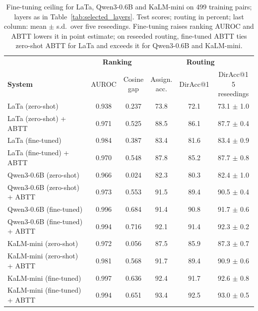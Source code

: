 \begin{table}[t]
\centering
\small
\setlength{\tabcolsep}{4pt}
\begin{tabular}{lccccc}
\toprule
& \multicolumn{2}{c}{\textbf{Ranking}} & \multicolumn{3}{c}{\textbf{Routing}} \\
\cmidrule(lr){2-3}\cmidrule(lr){4-6}
\textbf{System} & AUROC & \makecell{Cosine\\gap} & \makecell{Assign.\\acc.} & DirAcc@1 & \makecell{DirAcc@1\\5 reseedings} \\
\midrule
LaTa (zero-shot) & 0.938 & 0.237 & 73.8 & 72.1 & 73.1 $\pm$ 1.0 \\
LaTa (zero-shot) + ABTT & 0.971 & 0.525 & 88.5 & 86.1 & 87.7 $\pm$ 0.4 \\
LaTa (fine-tuned) & 0.984 & 0.387 & 83.4 & 81.6 & 83.4 $\pm$ 0.9 \\
LaTa (fine-tuned) + ABTT & 0.970 & 0.548 & 87.8 & 85.2 & 87.7 $\pm$ 0.8 \\
\midrule
Qwen3-0.6B (zero-shot) & 0.966 & 0.024 & 82.3 & 80.3 & 82.4 $\pm$ 1.0 \\
Qwen3-0.6B (zero-shot) + ABTT & 0.973 & 0.553 & 91.5 & 89.4 & 90.5 $\pm$ 0.4 \\
Qwen3-0.6B (fine-tuned) & 0.996 & 0.684 & 91.4 & 90.8 & 91.7 $\pm$ 0.6 \\
Qwen3-0.6B (fine-tuned) + ABTT & 0.994 & 0.716 & 92.1 & 91.4 & 92.3 $\pm$ 0.2 \\
\midrule
KaLM-mini (zero-shot) & 0.972 & 0.056 & 87.5 & 85.9 & 87.3 $\pm$ 0.7 \\
KaLM-mini (zero-shot) + ABTT & 0.981 & 0.568 & 91.7 & 89.4 & 90.9 $\pm$ 0.6 \\
KaLM-mini (fine-tuned) & 0.997 & 0.636 & 92.4 & 91.7 & 92.6 $\pm$ 0.8 \\
KaLM-mini (fine-tuned) + ABTT & 0.994 & 0.651 & 93.4 & 92.5 & 93.0 $\pm$ 0.5 \\
\bottomrule
\end{tabular}
\caption{Fine-tuning ceiling for LaTa, Qwen3-0.6B and KaLM-mini on 499 training pairs; layers as in Table~\ref{tab:selected_layers}. Test scores; routing in percent; last column: mean $\pm$ s.d.\ over five reseedings. Fine-tuning raises ranking AUROC and ABTT lowers it in point estimate; on reseeded routing, fine-tuned ABTT ties zero-shot ABTT for LaTa and exceeds it for Qwen3-0.6B and KaLM-mini.}
\label{tab:finetune_ceiling}
\end{table}
